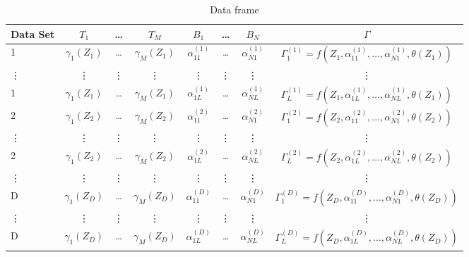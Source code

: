 \documentclass{article}
\begin{document}
\begin{table}[H]
\centering
\begin{tabular}{||l||c|c|c||c|c|c|c||}
\hline
Data Set & $T_1$           & \dots    & $T_M$            & $B_1$              & \dots  & $B_N$                & $\Gamma$         \\
\hline
1        & $\gamma_1(Z_1)$ & \dots    & $\gamma_M(Z_1)$ & $\alpha_{11}^{(1)}$ & \dots  & $\alpha_{N1}^{(1)}$  & $\Gamma_1^{(1)}=f(Z_1,\alpha_{11}^{(1)},\dots, \alpha_{N1}^{(1)}, \theta(Z_1))$ \\
\vdots   & \vdots          & \vdots   & \vdots          & \vdots              & \vdots & \vdots               & \vdots         \\
1        & $\gamma_1(Z_1)$ & \dots    & $\gamma_M(Z_1)$ & $\alpha_{1L}^{(1)}$ & \dots  & $\alpha_{NL}^{(1)}$  & $\Gamma_L^{(1)}=f(Z_1,\alpha_{1L}^{(1)},\dots, \alpha_{NL}^{(1)}, \theta(Z_1))$ \\
\hline
2        & $\gamma_1(Z_2)$ & \dots    & $\gamma_M(Z_2)$ & $\alpha_{11}^{(2)}$ & \dots  & $\alpha_{N1}^{(2)}$  & $\Gamma_1^{(2)}=f(Z_2,\alpha_{11}^{(2)},\dots, \alpha_{N1}^{(2)}, \theta(Z_2))$ \\
\vdots   & \vdots          & \vdots   & \vdots          & \vdots              & \vdots & \vdots               & \vdots         \\
2        & $\gamma_1(Z_2)$ & \dots    & $\gamma_M(Z_2)$ & $\alpha_{1L}^{(2)}$ & \dots  & $\alpha_{NL}^{(2)}$  & $\Gamma_L^{(2)}=f(Z_2,\alpha_{1L}^{(2)},\dots, \alpha_{NL}^{(2)}, \theta(Z_2))$ \\
\hline
\vdots   & \vdots          & \vdots   & \vdots          & \vdots              & \vdots & \vdots               & \vdots         \\
\hline
D        & $\gamma_1(Z_D)$ & \dots    & $\gamma_M(Z_D)$ & $\alpha_{11}^{(D)}$ & \dots  & $\alpha_{N1}^{(D)}$  & $\Gamma_1^{(D)}=f(Z_D,\alpha_{11}^{(D)},\dots, \alpha_{N1}^{(D)}, \theta(Z_D))$ \\
\vdots   & \vdots          & \vdots   & \vdots          & \vdots              & \vdots & \vdots               & \vdots         \\
D        & $\gamma_1(Z_D)$ & \dots    & $\gamma_M(Z_D)$ & $\alpha_{1L}^{(D)}$ & \dots  & $\alpha_{NL}^{(D)}$  & $\Gamma_L^{(D)}=f(Z_D,\alpha_{1L}^{(D)},\dots, \alpha_{NL}^{(D)}, \theta(Z_D))$ \\
\hline
\end{tabular}
\caption{Data frame}
\label{second table}
\end{table}
\end{document}
